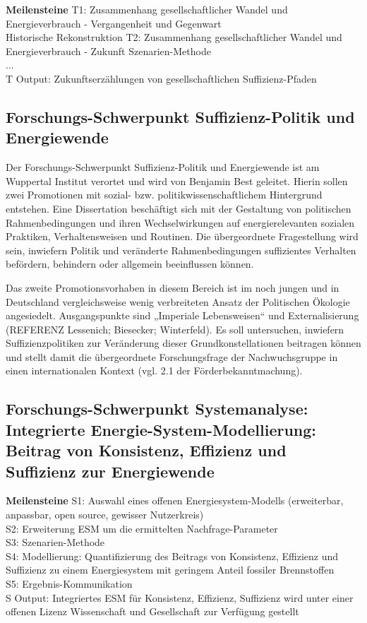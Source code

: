 \documentclass[a4paper,11pt,twoside]{scrartcl}
\begin{document}
\textbf{Meilensteine}
T1: Zusammenhang gesellschaftlicher Wandel und Energieverbrauch - Vergangenheit und Gegenwart\\ Historische Rekonstruktion
T2: Zusammenhang gesellschaftlicher Wandel und Energieverbrauch - Zukunft Szenarien-Methode\\
...\\
T Output: Zukunftserzählungen von gesellschaftlichen Suffizienz-Pfaden

\subsection*{Forschungs-Schwerpunkt Suffizienz-Politik und Energiewende}
Der Forschungs-Schwerpunkt Suffizienz-Politik und Energiewende ist am Wuppertal Institut verortet und wird von Benjamin Best geleitet. Hierin sollen zwei Promotionen mit sozial- bzw. politikwissenschaftlichem Hintergrund entstehen. 
Eine Dissertation beschäftigt sich mit der Gestaltung von politischen Rahmenbedingungen und ihren Wechselwirkungen auf energierelevanten sozialen Praktiken, Verhaltensweisen und Routinen. Die übergeordnete Fragestellung wird sein, inwiefern Politik und veränderte Rahmenbedingungen suffizientes Verhalten befördern, behindern oder allgemein beeinflussen können.

Das zweite Promotionsvorhaben in diesem Bereich ist im noch jungen und in Deutschland vergleichsweise wenig verbreiteten Ansatz der Politischen Ökologie angesiedelt. Ausgangspunkte sind „Imperiale Lebensweisen“ \cite{Brand2017}und Externalisierung (REFERENZ Lessenich; Biesecker; Winterfeld). Es soll untersuchen, inwiefern Suffizienzpolitiken zur Veränderung dieser Grundkonstellationen beitragen können und stellt damit die übergeordnete Forschungsfrage der Nachwuchsgruppe in einen internationalen Kontext (vgl. 2.1 der Förderbekanntmachung).



\subsection*{Forschungs-Schwerpunkt Systemanalyse: Integrierte Energie-System-Modellierung: Beitrag von Konsistenz, Effizienz und Suffizienz zur Energiewende}

\textbf{Meilensteine}
S1: Auswahl eines offenen Energiesystem-Modells (erweiterbar, anpassbar, open source, gewisser Nutzerkreis)\\
S2: Erweiterung ESM um die ermittelten Nachfrage-Parameter\\
S3: Szenarien-Methode\\
S4: Modellierung: Quantifizierung des Beitrags von Konsistenz, Effizienz und Suffizienz zu einem Energiesystem mit geringem Anteil fossiler Brennstoffen\\
S5: Ergebnis-Kommunikation\\
S Output: Integriertes ESM für Konsistenz, Effizienz, Suffizienz wird unter einer offenen Lizenz Wissenschaft und Gesellschaft zur Verfügung gestellt
\end{document}
